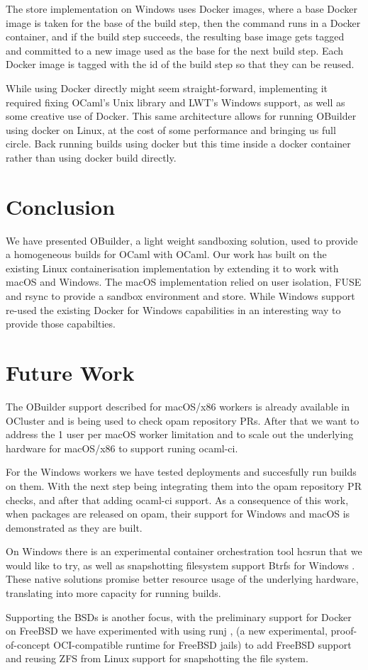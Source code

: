 \documentclass[manuscript,screen,sigplan]{acmart}
\begin{document}
The store implementation on Windows uses Docker images, where a base Docker image is taken for the base of the build step, then the command runs in a Docker container, and if the build step succeeds, the resulting base image gets tagged and committed to a new image used as the base for the next build step. Each Docker image is tagged with the id of the build step so that they can be reused.

While using Docker directly might seem straight-forward, implementing it required fixing OCaml’s Unix library and LWT's Windows support, as well as some creative use of Docker. This same architecture allows for running OBuilder using docker on Linux, at the cost of some performance and bringing us full circle. Back running builds using docker but this time inside a docker container rather than using docker build directly.

\section{Conclusion}

We have presented OBuilder, a light weight sandboxing solution, used to provide a homogeneous builds for OCaml with OCaml. Our work has built on the existing Linux containerisation implementation by extending it to work with macOS and Windows. The macOS implementation relied on user isolation, FUSE and rsync to provide a sandbox environment and store. While Windows support re-used the existing Docker for Windows capabilities in an interesting way to provide those capabilties.

\section{Future Work}

The OBuilder support described for macOS/x86 workers is already available in OCluster and is being used to check opam repository PRs. After that we want to address the 1 user per macOS worker limitation and to scale out the underlying hardware for macOS/x86 to support runing ocaml-ci.

For the Windows workers we have tested deployments and succesfully run builds on them. With the next step being integrating them into the opam repository PR checks, and after that adding ocaml-ci support. As a consequence of this work, when packages are released on opam, their support for Windows and macOS is demonstrated as they are built.

On Windows there is an experimental container orchestration tool hcsrun that we would like to try, as well as snapshotting filesystem support Btrfs for Windows \cite{BtrfsWindows16}. These native solutions promise better resource usage of the underlying hardware, translating into more capacity for running builds.

Supporting the BSDs is another focus, with the preliminary support for Docker on FreeBSD we have experimented with using runj \cite{runj21}, (a new experimental, proof-of-concept OCI-compatible runtime for FreeBSD jails) to add FreeBSD support and reusing ZFS from Linux support for snapshotting the file system. 



\end{document}
